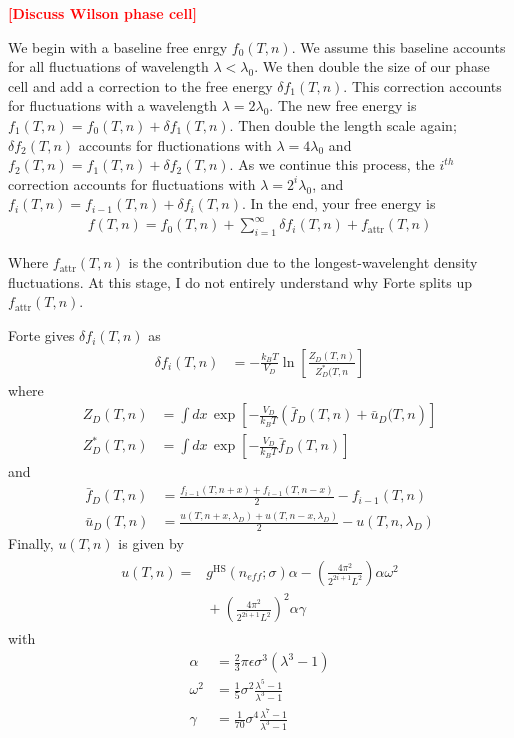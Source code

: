 \documentclass[letterpaper,twocolumn,amsmath,amssymb,prb]{revtex4-1}
\newcommand{\kT}{\ensuremath{k_BT}}
\newcommand{\fattr}{\ensuremath{f_\text{attr}(T,n)}}
\newcommand{\1}{\ensuremath{\textbf{r}_1}}
\newcommand{\2}{\ensuremath{\textbf{r}_2}}
\newcommand{\3}{\ensuremath{\textbf{r}_3}}
\newcommand{\4}{\ensuremath{\textbf{r}_4}}
\newcommand{\fixme}[1]{\textcolor{red}{\textbf{[#1]}}}
\begin{document}
\fixme{Discuss Wilson phase cell}

We begin with a baseline free enrgy $f_0(T,n)$. We assume this baseline accounts for all fluctuations of wavelength $\lambda < \lambda_0$. We then double the size of our phase cell and add a correction to the free energy $\delta f_1(T,n)$. This correction accounts for fluctuations with a wavelength $\lambda = 2\lambda_0$. The new free energy is $f_1(T,n) = f_0(T,n) + \delta f_1(T,n)$. Then double the length scale again; $\delta f_2(T,n)$ accounts for fluctionations with $\lambda = 4\lambda_0$ and $f_2(T,n) = f_1(T,n) + \delta f_2(T,n)$. As we continue this process, the $i^{th}$ correction accounts for fluctuations with $\lambda = 2^i\lambda_0$, and $f_i(T,n) = f_{i-1}(T,n) + \delta f_i(T,n)$. In the end, your free energy is
\begin{align}
  f(T,n) = f_0(T,n) + \sum_{i=1}^\infty\delta f_i(T,n) + \fattr
\end{align}

Where $\fattr$ is the contribution due to the longest-wavelenght density fluctuations. At this stage, I do not entirely understand why Forte splits up $\fattr$.

Forte gives $\delta f_i(T,n)$ as
\begin{align}
  \delta f_i(T,n) &= -\frac{\kT}{V_D}\ln\left[ \frac{Z_D(T,n)}{Z_D^*(T,n} \right]
\end{align}
where
\begin{align}
  Z_D(T,n) &= \int dx\, \exp\left[ -\frac{V_D}{\kT}\left( \bar{f}_D(T,n) + \bar{u}_D(T,n \right) \right] \\
  Z_D^*(T,n) &= \int dx\, \exp\left[ -\frac{V_D}{\kT}\bar{f}_D(T,n) \right]
\end{align}
and
\begin{align}
  \bar{f}_D(T,n) &= \frac{f_{i-1}(T,n+x) + f_{i-1}(T,n-x)}{2} - f_{i-1}(T,n) \\
  \bar{u}_D(T,n) &= \frac{u(T,n+x,\lambda_D) + u(T,n-x,\lambda_D)}{2} - u(T,n,\lambda_D)
\end{align}
Finally, $u(T,n)$ is given by
\begin{align}
  \begin{split}
  u(T,n) = &{} g^\text{HS}(n_{eff};\sigma)\alpha - \left( \frac{4\pi^2}{2^{2i+1}L^2} \right)\alpha\omega^2 \\ &{} + \left( \frac{4\pi^2}{2^{2i+1}L^2} \right)^2\alpha\gamma
  \end{split}
\end{align}
with
\begin{align}
  \alpha &= \frac{2}{3}\pi\epsilon\sigma^3(\lambda^3 - 1) \\
  \omega^2 &= \frac{1}{5}\sigma^2\frac{\lambda^5 - 1}{\lambda^3 - 1} \\
  \gamma &= \frac{1}{70}\sigma^4\frac{\lambda^7 - 1}{\lambda^3 - 1}
\end{align}
\end{document}
